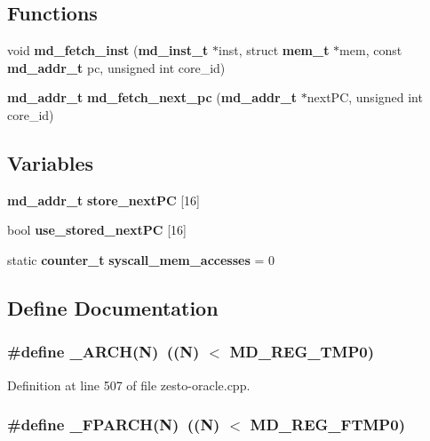 \subsection*{Functions}
\begin{CompactItemize}
\item 
void {\bf md\_\-fetch\_\-inst} ({\bf md\_\-inst\_\-t} $\ast$inst, struct {\bf mem\_\-t} $\ast$mem, const {\bf md\_\-addr\_\-t} pc, unsigned int core\_\-id)
\item 
{\bf md\_\-addr\_\-t} {\bf md\_\-fetch\_\-next\_\-pc} ({\bf md\_\-addr\_\-t} $\ast$nextPC, unsigned int core\_\-id)
\end{CompactItemize}
\subsection*{Variables}
\begin{CompactItemize}
\item 
{\bf md\_\-addr\_\-t} {\bf store\_\-nextPC} [16]
\item 
bool {\bf use\_\-stored\_\-nextPC} [16]
\item 
static {\bf counter\_\-t} {\bf syscall\_\-mem\_\-accesses} = 0
\end{CompactItemize}


\subsection{Define Documentation}
\subsubsection[{\_\-ARCH}]{\setlength{\rightskip}{0pt plus 5cm}\#define \_\-ARCH(N)~((N) $<$ MD\_\-REG\_\-TMP0)}\label{zesto-oracle_8cpp_93a68b4412d259f67d1257b64267534d}




Definition at line 507 of file zesto-oracle.cpp.
\subsubsection[{\_\-FPARCH}]{\setlength{\rightskip}{0pt plus 5cm}\#define \_\-FPARCH(N)~((N) $<$ MD\_\-REG\_\-FTMP0)}\label{zesto-oracle_8cpp_4c385ed05e0bd8490781f35a122a0241}




